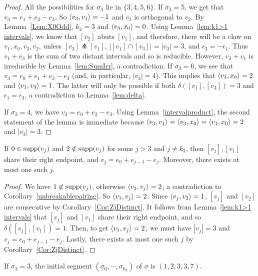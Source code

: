 \begin{proof}
All the possibilities for $\sigma_3$ lie in $\{ 3,4,5,6\}$. If $\sigma_3=5$, we get that $v_3=e_1+e_2-e_3$. So $\left\langle v_3 , v_1 \right\rangle=-1$ and $v_3$ is orthogonal to $v_2$. By Lemma~\ref{Lem:X0Odd}, $k_2=3$ and $\left\langle v_3 , x_0 \right\rangle=0$.
Using Lemma~\ref{lem:k1>1 intervals}, we know that $[v_2]$ abuts $[v_1]$, and therefore, there will be a claw on $v_1, x_0, v_3, v_2$, unless $[v_3]\pitchfork [v_1]$, $|[v_1]\cap [v_3]|=|v_3|=3$, and $\epsilon_3=-\epsilon_1$. Thus $v_1+v_3$ is the sum of two distant intervals and so is reducible. However, $v_3+v_1$ is irreducible by Lemma~\ref{lem:SumIrr}, a contradiction. If $\sigma_3=6$, we see that $v_3=e_0+e_1+e_2-e_3$ (and, in particular, $|v_3|=4$). This implies that $\left\langle v_3 , x_0 \right\rangle=2$ and $\left\langle v_1 , v_3 \right\rangle=1$. The latter will only be possible if both $\delta([v_1], [v_3])=3$ and $\epsilon_1 = \epsilon_3$, a contradiction to Lemma~\ref{lem:delta}. 

If $\sigma_3=4$, we have $v_3=e_0+e_2-e_3$. Using Lemma~\ref{intervalproduct}, the second statement of the lemma is immediate because $\left\langle v_3 , v_1 \right\rangle=\left\langle v_3 , x_0 \right\rangle=\left\langle v_1 , x_0 \right\rangle=2$ and $|v_3|=3$.
\end{proof}

\begin{lemma}\label{lem:0No2}
If $0\in\operatorname{supp}(v_j)$ and $2\notin\operatorname{supp}(v_j)$ for some $j>3$ and $j\ne k_3$, then $[v_j],[v_1]$ share their right endpoint, and $v_j=e_0+e_{j-1}-e_j$. Moreover, there exists at most one such $j$.
\end{lemma}
\begin{proof}
We have $1\not\in \operatorname{supp}(v_j)$, otherwise $\left\langle v_2 , v_j \right\rangle=2$, a contradiction to Corollary~\ref{unbreakablepairing}. So $\left\langle v_1 , v_j \right\rangle=2$. Since $\left\langle v_{j} , v_2 \right\rangle=1$, $[v_j]$ and $[v_2]$ are consecutive by Corollary~\ref{Cor:ZjDistinct}. It follows from Lemma~\ref{lem:k1>1 intervals} that $[v_{j}]$ and $[v_1]$ share their right endpoint, and so $\delta([v_{j}], [v_1])=1$. Then, to get $\left\langle v_1 , v_{j} \right\rangle=2$, we must have $|v_{j}|=3$ and $v_{j}=e_0+e_{j-1}-e_{j}$. Lastly, there exists at most one such $j$ by Corollary~\ref{Cor:ZjDistinct}.
\end{proof}


\begin{prop}\label{prop6.1}
If $\sigma_3=3$, the initial segment $(\sigma_0, \cdots, \sigma_{k_3})$ of $\sigma$ is $(1,2,3,3,7)$.
\end{prop}

